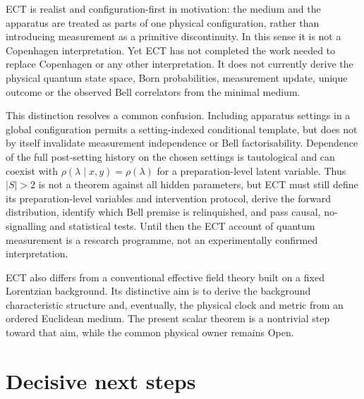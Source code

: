 \documentclass[11pt,a4paper]{article}
\begin{document}
ECT is realist and configuration-first in motivation: the medium and the
apparatus are treated as parts of one physical configuration, rather than
introducing measurement as a primitive discontinuity.  In this sense it is
not a Copenhagen interpretation.  Yet ECT has not completed the work needed
to replace Copenhagen or any other interpretation.  It does not currently
derive the physical quantum state space, Born probabilities, measurement
update, unique outcome or the observed Bell correlators from the minimal
medium.

This distinction resolves a common confusion.  Including apparatus settings
in a global configuration permits a setting-indexed conditional template, but
does not by itself invalidate measurement independence or Bell
factorisability.  Dependence of the full post-setting history on the chosen
settings is tautological and can coexist with
$\rho(\lambda\mid x,y)=\rho(\lambda)$ for a preparation-level latent variable.
Thus $|S|>2$ is not a theorem against all hidden parameters, but ECT must still
define its preparation-level variables and intervention protocol, derive the
forward distribution, identify which Bell premise is relinquished, and pass
causal, no-signalling and statistical tests.  Until then the ECT account of
quantum measurement is a research programme, not an experimentally confirmed
interpretation.

ECT also differs from a conventional effective field theory built on a fixed
Lorentzian background.  Its distinctive aim is to derive the background
characteristic structure and, eventually, the physical clock and metric from
an ordered Euclidean medium.  The present scalar theorem is a nontrivial step
toward that aim, while the common physical owner remains Open.

\section{Decisive next steps}
\label{sec:next}
\end{document}
